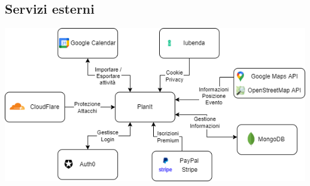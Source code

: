 \subsection*{Servizi esterni}
\begin{center}
    \includegraphics[width=1\textwidth]{img/Servizi/Servizi esterni.drawio.png}
\end{center}